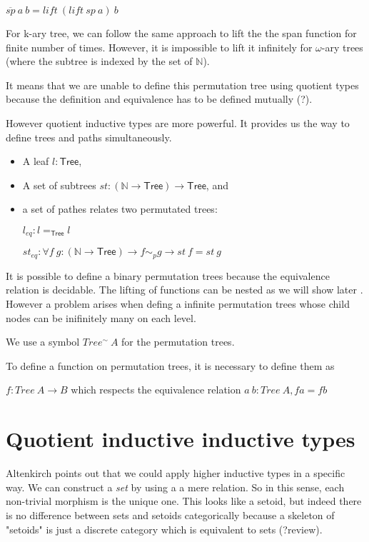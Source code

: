 $\overline{sp}~a~b = lift~(lift~sp~a)~b$


For k-ary tree, we can follow the same approach to lift the the span
function for finite number of times. However, it is impossible to lift
it infinitely for $\omega$-ary trees (where the subtree is indexed by
the set of $\mathbb{N}$).

It means that we are unable to define this permutation tree using
quotient types because the definition and equivalence has to be
defined mutually (?).

However quotient inductive types are more powerful. It provides us the
way to define trees and paths simultaneously.

\begin{itemize}
\item A leaf $l: \mathsf{Tree}$, 
\item A set of subtrees $st : (\mathbb{N} \rightarrow \mathsf{Tree}) \rightarrow \mathsf{Tree}$,
  and
\item a set of pathes relates two permutated trees:

$l_{eq} : l  =_{\mathsf{Tree}} l $

$st_{eq} : \forall f~g : (\mathbb{N} \rightarrow \mathsf{Tree}) \rightarrow
f \sim_{p} g \rightarrow  st~f = st~g$
\end{itemize}

It is possible to define a binary permutation trees because the
equivalence relation is decidable. The lifting of functions can be
nested as we will show later \todo{}.
However a problem arises when defing a infinite permutation trees
whose child nodes can be inifinitely many on each level.

We use a symbol $Tree^{\sim}~A$ for the permutation trees.

To define a function on permutation trees, it is necessary to define
them as

$f : Tree~A \rightarrow B$ which respects the equivalence relation
$a~b : Tree~A, f a = f b$

\section{Quotient inductive inductive types}

Altenkirch points out that we could apply higher inductive types in a
specific way. We can construct a \emph{set} by using a a mere
relation. So in this sense, each non-trivial morphism is the unique
one. This looks like a setoid, but indeed there is no difference
between sets and setoids categorically because a skeleton of "setoids"
is just a discrete category which is equivalent to sets (?review).


